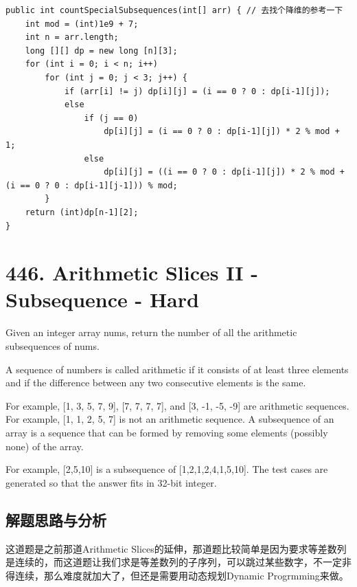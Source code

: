\documentclass[9pt, b5paaper]{book}
\begin{document}
\begin{verbatim}
public int countSpecialSubsequences(int[] arr) { // 去找个降维的参考一下
    int mod = (int)1e9 + 7;
    int n = arr.length;
    long [][] dp = new long [n][3];
    for (int i = 0; i < n; i++) 
        for (int j = 0; j < 3; j++) {
            if (arr[i] != j) dp[i][j] = (i == 0 ? 0 : dp[i-1][j]);
            else 
                if (j == 0)
                    dp[i][j] = (i == 0 ? 0 : dp[i-1][j]) * 2 % mod + 1;
                else
                    dp[i][j] = ((i == 0 ? 0 : dp[i-1][j]) * 2 % mod + (i == 0 ? 0 : dp[i-1][j-1])) % mod;
        }
    return (int)dp[n-1][2];
}
\end{verbatim}

\section{446. Arithmetic Slices II - Subsequence - Hard}
\label{sec-1-67}
Given an integer array nums, return the number of all the arithmetic subsequences of nums.

A sequence of numbers is called arithmetic if it consists of at least three elements and if the difference between any two consecutive elements is the same.

For example, [1, 3, 5, 7, 9], [7, 7, 7, 7], and [3, -1, -5, -9] are arithmetic sequences.
For example, [1, 1, 2, 5, 7] is not an arithmetic sequence.
A subsequence of an array is a sequence that can be formed by removing some elements (possibly none) of the array.

For example, [2,5,10] is a subsequence of [1,2,1,2,4,1,5,10].
The test cases are generated so that the answer fits in 32-bit integer.
\subsection{解题思路与分析}
\label{sec-1-67-1}
这道题是之前那道Arithmetic Slices的延伸，那道题比较简单是因为要求等差数列是连续的，而这道题让我们求是等差数列的子序列，可以跳过某些数字，不一定非得连续，那么难度就加大了，但还是需要用动态规划Dynamic Progrmming来做。
\end{document}
